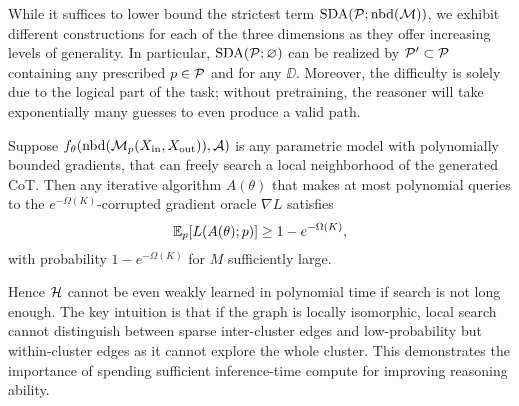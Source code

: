 \begin{rmk}
While it suffices to lower bound the strictest term $\operatorname{SDA}(\mathcal{P};\operatorname{nbd}(\mathcal{M}))$, we exhibit different constructions for each of the three dimensions as they offer increasing levels of generality. In particular, $\operatorname{SDA}(\mathcal{P};\varnothing)$ can be realized by $\mathcal{P}'\subset\mathcal{P}$ containing any prescribed $p\in\mathcal{P}$ and for any $\DD$. Moreover, the difficulty is solely due to the logical part of the task; without pretraining, the reasoner will take exponentially many guesses to even produce a valid path.
\end{rmk}

\begin{cor}\label{thm:hard}
Suppose $f_\theta(\operatorname{nbd}(\mathcal{M}_p(X_{\operatorname{in}},X_{\operatorname{out}})),\mathcal{A})$ is any parametric model with polynomially bounded gradients, that can freely search a local neighborhood of the generated CoT. Then any iterative algorithm $A(\theta)$ that makes at most polynomial queries to the $e^{-\Omega(K)}$-corrupted gradient oracle $\nabla L$ satisfies
\begin{equation*}
\mathbb{E}_{p}[L(A(\theta);p)] \ge 1-e^{-\Omega(K)},
\end{equation*}
with probability $1-e^{-\Omega(K)}$ for $M$ sufficiently large.
\end{cor}

Hence $\mathcal{H}$ cannot be even weakly learned in polynomial time if search is not long enough. The key intuition is that if the graph is locally isomorphic, local search cannot distinguish between sparse inter-cluster edges and low-probability but within-cluster edges as it cannot explore the whole cluster. This demonstrates the importance of spending sufficient inference-time compute for improving reasoning ability.



